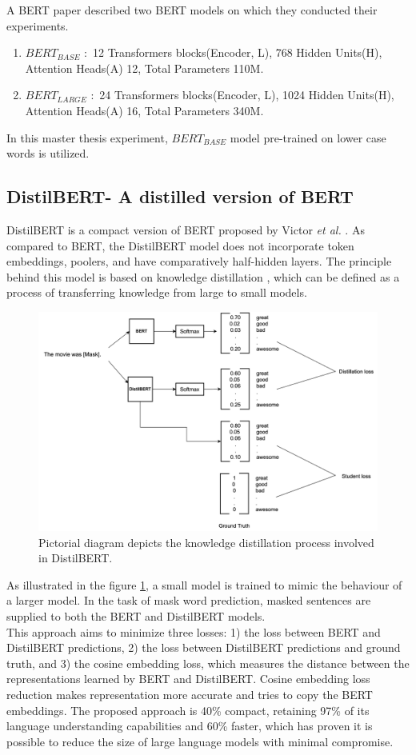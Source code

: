 \documentclass[%
	BCOR=8mm, %
	DIV=12,
	toc=bibliography, %
	toc=listof, %
	oneside, %
	egregdoesnotlikesansseriftitles, %
	]{scrbook}
\begin{document}
A BERT paper \cite{devlin_bert_2019-1} described two BERT models on which they conducted their experiments. 
\begin{enumerate}
    \item $BERT_{BASE}$ $:$ 12 Transformers blocks(Encoder, L), 768 Hidden Units(H), Attention Heads(A) 12, Total Parameters 110M.
    \item $BERT_{LARGE}$ $:$ 24 Transformers blocks(Encoder, L), 1024 Hidden Units(H), Attention Heads(A) 16, Total Parameters 340M.
\end{enumerate}
In this master thesis experiment, $BERT_{BASE}$ model  pre-trained on lower case words is utilized. 

\subsection{DistilBERT- A distilled version of BERT}
DistilBERT is a compact version of BERT proposed by Victor \textit{et al.} \cite{sanh_distilbert_2020}. As compared to BERT, the DistilBERT model does not incorporate token embeddings, poolers, and have comparatively half-hidden layers. The principle behind this model is based on knowledge distillation \cite{hinton_distilling_2015}, which can be defined as a process of transferring knowledge from large  to small models. \\
\begin{figure}[H]
    \centering
    \includegraphics[width=0.8\linewidth]{img/DistilBERT.png}
    \caption[Diagram of DistilBERT training.]{ Pictorial diagram depicts the knowledge distillation process involved in  DistilBERT.}
    \label{fig:DistilBERT}
\end{figure}
As illustrated in the figure \ref{fig:DistilBERT}, a small model is trained to mimic the behaviour of a larger model. In the task of mask word prediction, masked sentences are supplied to both the BERT and DistilBERT models.\\
This approach aims to minimize three losses: 1) the loss between BERT and DistilBERT predictions, 2) the loss between DistilBERT predictions and ground truth, and 3) the cosine embedding loss, which measures the distance between the representations learned by BERT and DistilBERT. Cosine embedding loss reduction makes representation more accurate and tries to copy the BERT embeddings. The proposed approach is 40\% compact, retaining 97\% of its language understanding capabilities and 60\% faster\cite{sanh_distilbert_2020}, which has proven it is possible to reduce the size of large language models with minimal compromise.
\end{document}
